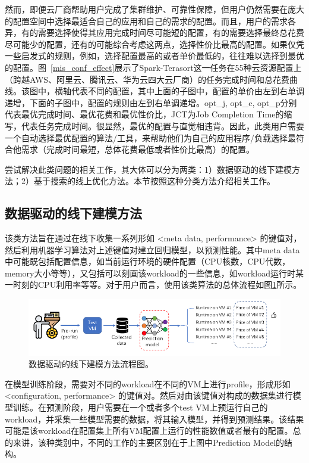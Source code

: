 然而，即便云厂商帮助用户完成了集群维护、可靠性保障，但用户仍然需要在庞大的配置空间中选择最适合自己的应用和自己的需求的配置。而且，用户的需求各异，有的需要选择使得其应用完成时间尽可能短的配置，有的需要选择最终总花费尽可能少的配置，还有的可能综合考虑这两点，选择性价比最高的配置。如果仅凭一些启发式的规则，例如，选择配置最高的或者单价最低的，往往难以选择到最优的配置。图~\ref{mis_conf_effect}展示了Spark-Terasort这一任务在55种云资源配置上（跨越AWS、阿里云、腾讯云、华为云四大云厂商）的任务完成时间和总花费曲线。该图中，横轴代表不同的配置，其中上面的子图中，配置的单价由左到右单调递增，下面的子图中，配置的规则由左到右单调递增。opt\_j, opt\_c, opt\_p分别代表最优完成时间、最优花费和最优性价比，JCT为Job Completion Time的缩写，代表任务完成时间。很显然，最优的配置与直觉相违背。因此，此类用户需要一个自动选择最优配置的算法/工具，来帮助他们为自己的应用程序/负载选择最符合他需求（完成时间最短，总体花费最低或者性价比最高）的配置。

尝试解决此类问题的相关工作，其大体可以分为两类：1）数据驱动的线下建模方法；2）基于搜索的线上优化方法。本节按照这种分类方法介绍相关工作。

\subsection{数据驱动的线下建模方法}

该类方法旨在通过在线下收集一系列形如 <meta data, performance> 的键值对，然后利用机器学习算法对上述键值对建立回归模型，以预测性能。其中meta data中可能既包括配置信息，如当前运行环境的硬件配置（CPU核数，CPU代数，memory大小等等），又包括可以刻画该workload的一些信息，如workload运行时某一时刻的CPU利用率等等。对于用户而言，使用该类算法的总体流程如图\ref{offline_profiling}所示。

\begin{figure}[h]
    \centerline{\includegraphics[width=\textwidth]{figures/offline_profiling.png}}
    \caption{数据驱动的线下建模方法流程图。}
    \label{offline_profiling}
\end{figure}

在模型训练阶段，需要对不同的workload在不同的VM上进行profile，形成形如<configuration, performance> 的键值对。然后对由该键值对构成的数据集进行模型训练。在预测阶段，用户需要在一个或者多个test VM上预运行自己的workload，并采集一些模型需要的数据，将其输入模型，并得到预测结果。该结果可能是该workload在配置集上所有VM配置上运行的性能数值或者最有的配置。总的来讲，该种类别中，不同的工作的主要区别在于上图中Prediction Model的结构。

